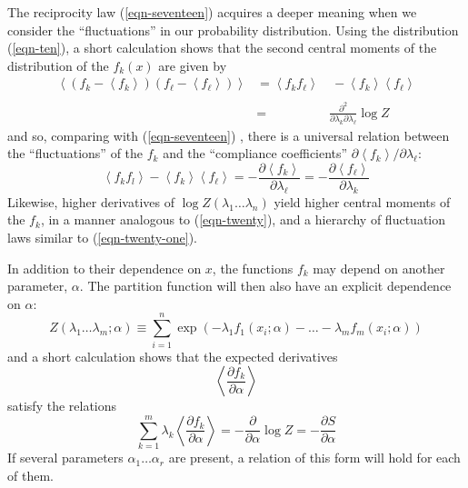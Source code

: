 \documentclass[]{article}
\begin{document}
The reciprocity law (\ref{eqn-seventeen}) acquires a deeper meaning when we consider the
``fluctuations'' in our probability distribution. Using the distribution
(\ref{eqn-ten}), a short calculation shows that the second central moments of the
distribution of the \(f_{k}(x)\) are given by
%
\begin{align}
\left\langle \left( f_{k} - \left\langle f_{k} \right\rangle \right)\left( f_{ \ell} - \left\langle f_{ \ell} \right\rangle \right) \right\rangle & = \left\langle f_{k}f_{ \ell} \right\rangle & \  - \left\langle f_{k} \right\rangle\left\langle f_{ \ell} \right\rangle \nonumber \\
& \label{eqn-twenty} \\
 & = & \frac{\partial^{2}}{\partial\lambda_{k}\partial\lambda_{ \ell}} \log Z \nonumber
\end{align}
%
and so, comparing with (\ref{eqn-seventeen}) , there is a universal relation between the
``fluctuations'' of the \(f_{k}\) and the ``compliance coefficients''
\(\partial\left\langle f_{k} \right\rangle/\partial\lambda_{ \ell}\):
%
\begin{equation}
\left\langle f_{k}f_{l} \right\rangle - \left\langle f_{k} \right\rangle\left\langle f_{ \ell} \right\rangle = - \frac{\partial\left\langle f_{k} \right\rangle}{\partial\lambda_{ \ell}} = - \frac{\partial\left\langle f_{ \ell} \right\rangle}{\partial\lambda_{k}} \label{eqn-twenty-one}
\end{equation}
%
Likewise, higher derivatives of
\( \log Z\left( \lambda_{1}\ldots\lambda_{n} \right)\) yield higher central
moments of the \(f_{k}\), in a manner analogous to (\ref{eqn-twenty}), and a hierarchy
of fluctuation laws similar to (\ref{eqn-twenty-one}).

In addition to their dependence on \(x\), the functions \(f_{k}\) may
depend on another parameter, \(\alpha.\) The partition function will
then also have an explicit dependence on \(\alpha\):
%
\begin{equation}
Z\left( \lambda_{1}\ldots\lambda_{m};\alpha \right) \equiv \sum_{i = 1}^{n}  \exp\left( - \lambda_{1}f_{1}\left( x_{i};\alpha \right) - \ldots - \lambda_{m}f_{m}\left( x_{i};\alpha \right) \right)
\end{equation}
%
and a short calculation shows that the expected derivatives
%
\begin{equation*}
\left\langle \frac{\partial f_{k}}{\partial\alpha} \right\rangle
\end{equation*}
%
satisfy the relations
%
\begin{equation}
\sum_{k = 1}^{m} \lambda_{k}\left\langle \frac{\partial f_{k}}{\partial\alpha} \right\rangle = - \frac{\partial}{\partial\alpha} \log Z = - \frac{\partial S}{\partial\alpha} \label{eqn-twenty-three}
\end{equation}
%
If several parameters \(\alpha_{1}\ldots\alpha_{r}\) are present, a
relation of this form will hold for each of them.
\end{document}
